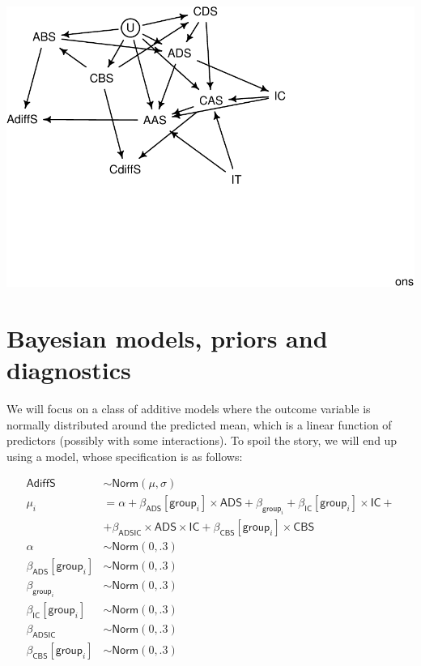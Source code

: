 \documentclass[10pt,dvipsnames,enabledeprecatedfontcommands]{scrartcl}
\begin{document}
\begin{center}\includegraphics[width=1\linewidth]{bayesianReport_files/figure-latex/dag2-1} \end{center}

\hypertarget{bayesian-models-priors-and-diagnostics}{%
\section{Bayesian models, priors and
diagnostics}\label{bayesian-models-priors-and-diagnostics}}

We will focus on a class of additive models where the outcome variable
is normally distributed around the predicted mean, which is a linear
function of predictors (possibly with some interactions). To spoil the
story, we will end up using a model, whose specification is as follows:

\begin{align*}
\mathsf{AdiffS} & \sim \textsf{Norm}(\mu, \sigma)\\
\mu_i & = \alpha + \beta_{\mathsf{ADS}}[\mathsf{group}_i]\times \mathsf{ADS} + \beta_{\mathsf{group}_i}  +
 \beta_{\mathsf{IC}}[\mathsf{group}_i]\times \mathsf{IC} + \\
 & + \beta_{\mathsf{ADSIC}}\times \mathsf{ADS} \times \mathsf{IC} + \beta_{\mathsf{CBS}}[\mathsf{group}_i] \times \mathsf{CBS}\\
 \alpha & \sim \textsf{Norm}(0,.3)\\
\beta_{\mathsf{ADS}}[\mathsf{group}_i] & \sim \textsf{Norm}(0,.3)\\
\beta_{\mathsf{group}_i} & \sim \textsf{Norm}(0,.3)\\
\beta_{\mathsf{IC}}[\mathsf{group}_i] & \sim \textsf{Norm}(0,.3)\\
 \beta_{\mathsf{ADSIC}} & \sim \textsf{Norm}(0,.3)\\
 \beta_{\mathsf{CBS}}[\mathsf{group}_i]& \sim \textsf{Norm}(0,.3)\\
\end{align*}
\end{document}
